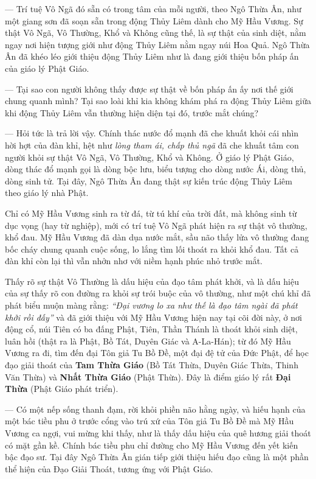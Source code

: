 --- Trí tuệ Vô Ngã đó sẵn có trong tâm của mỗi người, theo Ngô Thừa Ân, như một giang sơn đã soạn sẵn trong động Thủy Liêm dành cho Mỹ Hầu Vương. Sự thật Vô Ngã, Vô Thường, Khổ và Không cũng thế, là sự thật của sinh diệt, nằm ngay nơi hiện tượng giới như động Thủy Liêm nằm ngay núi Hoa Quả. Ngô Thừa Ân đã khéo léo giới thiệu động Thủy Liêm như là đang giới thiệu bốn pháp ấn của giáo lý Phật Giáo.

--- Tại sao con người không thấy được sự thật về bốn pháp ấn ấy nơi thế giới chung quanh mình? Tại sao loài khỉ kia không khám phá ra động Thủy Liêm giữa khi động Thủy Liêm vẫn thường hiện diện tại đó, trước mắt chúng?

--- Hỏi tức là trả lời vậy. Chính thác nước đổ mạnh đã che khuất khỏi cái nhìn hời hợt của đàn khỉ, hệt như \emph{lòng tham ái, chấp thủ ngã} đã che khuất tâm con người khỏi sự thật Vô Ngã, Vô Thường, Khổ và Không. Ở giáo lý Phật Giáo, dòng thác đổ mạnh gọi là dòng bộc lưu, biểu tượng cho dòng nước Ái, dòng thủ, dòng sinh tử. Tại đây, Ngô Thừa Ân đang thật sự kiến trúc động Thủy Liêm theo giáo lý nhà Phật.

Chỉ có Mỹ Hầu Vương sinh ra từ đá, từ tú khí của trời đất, mà không sinh từ dục vọng (hay từ nghiệp), mới có trí tuệ Vô Ngã phát hiện ra sự thật vô thường, khổ đau. Mỹ Hầu Vương đã dàn dụa nước mắt, sầu não thấy lửa vô thường đang bốc cháy chung quanh cuộc sống, lo lắng tìm lối thoát ra khỏi khổ đau. Tất cả đàn khỉ còn lại thì vẫn nhởn nhơ với niềm hạnh phúc nhỏ trước mắt.

Thấy rõ sự thật Vô Thường là dấu hiệu của đạo tâm phát khởi, và là dấu hiệu của sự thấy rõ con đường ra khỏi sự trói buộc của vô thường, như một chú khỉ đã phát biểu muộn màng rằng: \emph{``Đại vương lo xa như thế là đạo tâm ngài đã phát khởi rồi đấy''} và đã giới thiệu với Mỹ Hầu Vương hiện nay tại cõi đời này, ở nơi động cổ, núi Tiên có ba đấng Phật, Tiên, Thần Thánh là thoát khỏi sinh diệt, luân hồi (thật ra là Phật, Bồ Tát, Duyên Giác và A-La-Hán); từ đó Mỹ Hầu Vương ra đi, tìm đến đại Tôn giả Tu Bồ Đề, một đại đệ tử của Đức Phật, để học đạo giải thoát của {\bf Tam Thừa Giáo} (Bồ Tát Thừa, Duyên Giác Thừa, Thinh Văn Thừa) và {\bf Nhất Thừa Giáo} (Phật Thừa). Đây là điểm giáo lý rất {\bf Đại Thừa} (Phật Giáo phát triển).

--- Có một nếp sống thanh đạm, rời khỏi phiền não hằng ngày, và hiếu hạnh của một bác tiều phu ở trước cổng vào trú xứ của Tôn giả Tu Bồ Đề mà Mỹ Hầu Vương ca ngợi, vui mừng khi thấy, như là thấy dấu hiệu của quê hương giải thoát có mặt gần kề. Chính bác tiều phu chỉ đường cho Mỹ Hầu Vương đến yết kiến bậc đạo sư. Tại đây Ngô Thừa Ân gián tiếp giới thiệu hiếu đạo cũng là một phần thể hiện của Đạo Giải Thoát, tương ứng với Phật Giáo.

